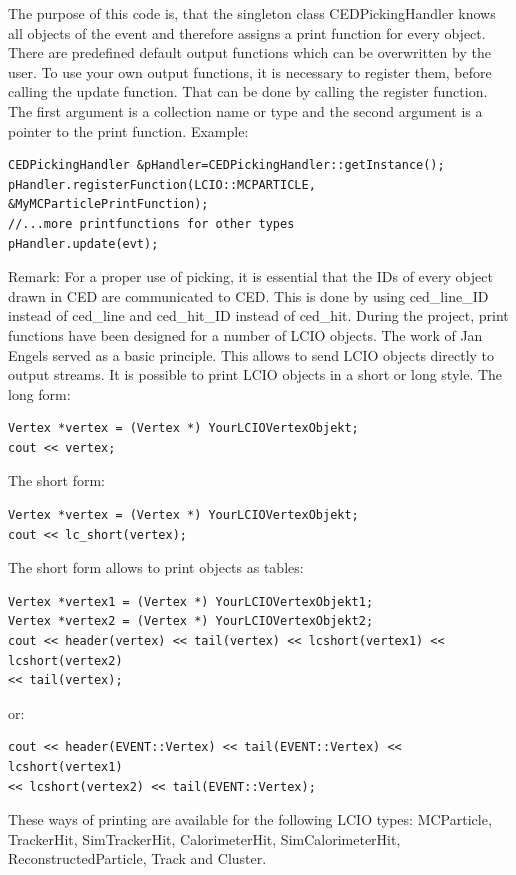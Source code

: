 \documentclass[a4paper,10pt]{article}
\begin{document}
The purpose of this code is, that the singleton class CEDPickingHandler knows all objects of the event and therefore assigns a print function for every object. There are predefined default output functions which can be overwritten by the user. To use your own output functions, it is necessary to register them, before calling the update function. That can be done by
calling the register function. The first argument is a collection name or type and the second argument is a pointer to the print function.
Example:
\begin{verbatim}
CEDPickingHandler &pHandler=CEDPickingHandler::getInstance();
pHandler.registerFunction(LCIO::MCPARTICLE, &MyMCParticlePrintFunction);
//...more printfunctions for other types
pHandler.update(evt);
\end{verbatim}

Remark: For a proper use of picking, it is essential that the IDs of every object drawn in CED are communicated to CED. This is done by using ced\_line\_ID instead of ced\_line and ced\_hit\_ID instead of ced\_hit. 
\newline
During the project, print functions have been designed for a number of LCIO objects. The work of Jan Engels served as a basic principle. This allows to send LCIO objects directly to output streams. It is possible to print LCIO objects in a short or long style. The long form:

\begin{verbatim}
Vertex *vertex = (Vertex *) YourLCIOVertexObjekt;
cout << vertex;
\end{verbatim}
The short form:
\begin{verbatim}
Vertex *vertex = (Vertex *) YourLCIOVertexObjekt;
cout << lc_short(vertex);
\end{verbatim}
The short form allows to print objects as tables:
\begin{verbatim}
Vertex *vertex1 = (Vertex *) YourLCIOVertexObjekt1;
Vertex *vertex2 = (Vertex *) YourLCIOVertexObjekt2;
cout << header(vertex) << tail(vertex) << lcshort(vertex1) << lcshort(vertex2)
<< tail(vertex);
\end{verbatim}
or:
\begin{verbatim}
cout << header(EVENT::Vertex) << tail(EVENT::Vertex) << lcshort(vertex1)
<< lcshort(vertex2) << tail(EVENT::Vertex);
\end{verbatim}
These ways of printing are available for the following LCIO types: MCParticle, TrackerHit,
SimTrackerHit, CalorimeterHit, SimCalorimeterHit, ReconstructedParticle, Track and Cluster.
\end{document}
